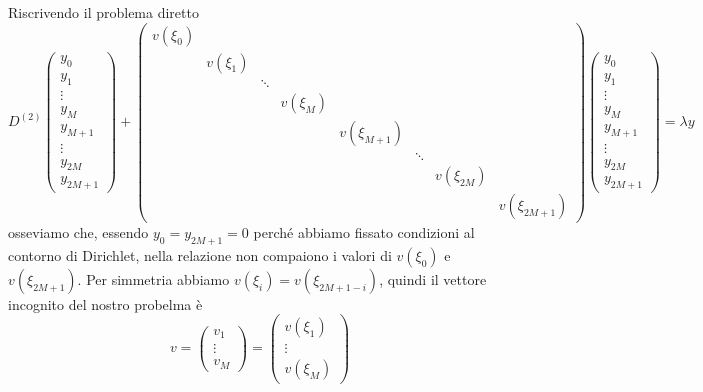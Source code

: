 \documentclass[a4paper,10pt]{article}
\theoremstyle{plain}
\theoremstyle{definition}
\theoremstyle{remark}
\begin{document}
Riscrivendo il problema diretto
\begin{equation*}
  D^{(2)} \begin{pmatrix}
    y_0 \\
    y_1 \\
    \vdots \\
    y_M \\
    y_{M+1} \\
    \vdots \\
    y _{2M} \\
    y _{2M+1} 
  \end{pmatrix} 
 + \begin{pmatrix}
    v(\xi _0) \\
    & v(\xi _1) \\
    & & \ddots  \\
    & & & v(\xi _M) \\
    & & & & v(\xi _{M+1}) \\
    & & & & & \ddots \\
    & & & & & & v( \xi _ {2M} ) \\
    & & & & & & & v(\xi _{2M+1}) 
    \end{pmatrix}
    \begin{pmatrix}
    y_0 \\
    y_1 \\
    \vdots \\
    y_M \\
    y_{M+1} \\
    \vdots \\
    y _{2M} \\
    y _{2M+1} 
  \end{pmatrix}
  = \lambda y
\end{equation*}
osseviamo che, essendo $y_0 = y_{2M+1} = 0$ perché abbiamo fissato
condizioni al contorno di Dirichlet, nella relazione non compaiono i
valori di $v(\xi _0)$ e $v(\xi _{2M+1})$. Per simmetria abbiamo $v(\xi
_i) = v(\xi _{2M+1-i})$, quindi il vettore incognito del nostro
probelma è
\[
v = 
\begin{pmatrix}
  v_1 \\
  \vdots \\
  v_M 
\end{pmatrix}
=
\begin{pmatrix}
  v(\xi _1) \\
  \vdots \\
  v(\xi _M )
\end{pmatrix}
\]
\end{document}
